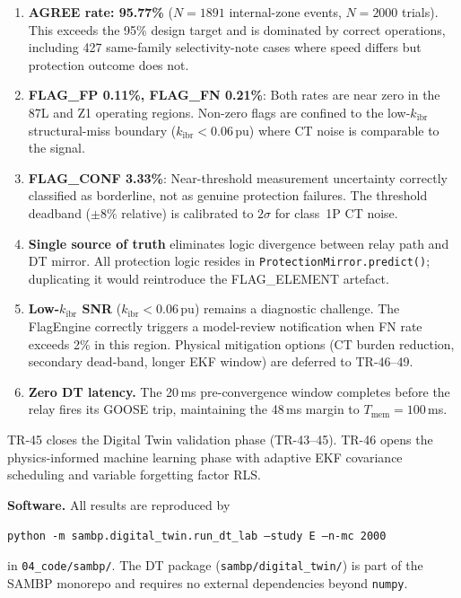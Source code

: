 \documentclass[11pt,a4paper]{article}
\newcommand{\kibr}{k_\mathrm{ibr}}
\begin{document}
\begin{enumerate}
  \item \textbf{AGREE rate: 95.77\%} ($N=1891$ internal-zone events, $N=2000$
    trials).  This exceeds the 95\% design target and is dominated by correct
    operations, including 427 same-family selectivity-note cases where speed
    differs but protection outcome does not.

  \item \textbf{FLAG\_FP 0.11\%, FLAG\_FN 0.21\%}: Both rates are near zero in
    the 87L and Z1 operating regions.  Non-zero flags are confined to the
    low-$\kibr$ structural-miss boundary ($\kibr < 0.06$\,pu) where CT noise
    is comparable to the signal.

  \item \textbf{FLAG\_CONF 3.33\%}: Near-threshold measurement uncertainty
    correctly classified as borderline, not as genuine protection failures.
    The threshold deadband ($\pm8\%$ relative) is calibrated to $2\sigma$
    for class~1P CT noise.

  \item \textbf{Single source of truth} eliminates logic divergence between
    relay path and DT mirror.  All protection logic resides in
    \texttt{ProtectionMirror.predict()}; duplicating it would reintroduce the
    FLAG\_ELEMENT artefact.

  \item \textbf{Low-$\kibr$ SNR} ($\kibr < 0.06$\,pu) remains a diagnostic
    challenge.  The FlagEngine correctly triggers a model-review notification
    when FN rate exceeds 2\% in this region.  Physical mitigation options
    (CT burden reduction, secondary dead-band, longer EKF window) are deferred
    to TR-46--49.

  \item \textbf{Zero DT latency.}  The 20\,ms pre-convergence window completes
    before the relay fires its GOOSE trip, maintaining the 48\,ms margin to
    $T_\mathrm{mem} = 100$\,ms.
\end{enumerate}

\noindent
TR-45 closes the Digital Twin validation phase (TR-43--45).  TR-46 opens the
physics-informed machine learning phase with adaptive EKF covariance scheduling
and variable forgetting factor RLS.

\bigskip

\noindent\textbf{Software.}
All results are reproduced by
\begin{center}
  \texttt{python -m sambp.digital\_twin.run\_dt\_lab --study E --n-mc 2000}
\end{center}
in \texttt{04\_code/sambp/}.  The DT package (\texttt{sambp/digital\_twin/})
is part of the SAMBP monorepo and requires no external dependencies beyond
\texttt{numpy}.



\end{document}
